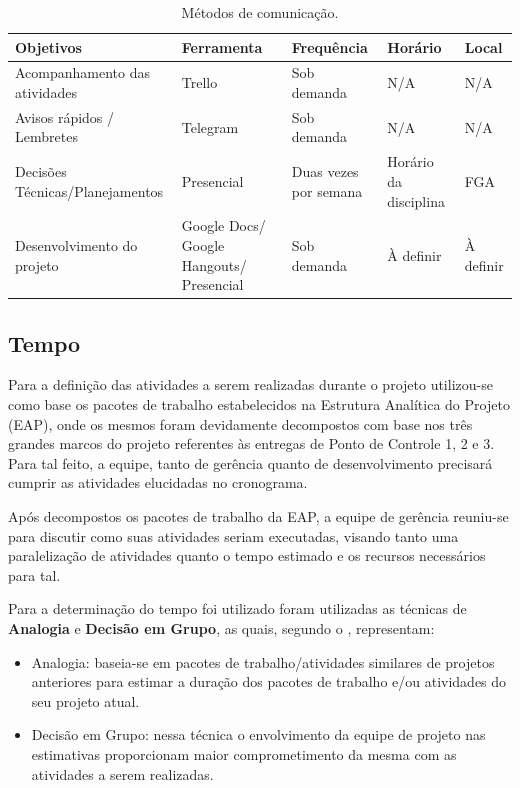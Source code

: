       \begin{table}[!htbp]
      \begin{center}
      \caption{\label{tab:com}Métodos de comunicação.}
      \begin{tabular}{|p{4cm}|p{4cm}|p{3cm}|p{3cm}|p{2cm}|}
      \hline
      \textbf{Objetivos} & \textbf{Ferramenta} & \textbf{Frequência} & \textbf{Horário} & \textbf{Local}\\\hline\hline
      Acompanhamento das atividades & Trello & Sob demanda & N/A & N/A\\\hline
      Avisos rápidos / Lembretes & Telegram & Sob demanda & N/A & N/A\\\hline
      Decisões Técnicas/Planejamentos & Presencial & Duas vezes por semana & Horário da disciplina & FGA\\\hline
      Desenvolvimento do projeto & Google Docs/ Google Hangouts/ Presencial & Sob demanda & À definir & À definir\\\hline
      \end{tabular}
      \end{center}
      \end{table}

    \subsection{Tempo}

      Para a definição das atividades a serem realizadas durante o
      projeto utilizou-se como base os pacotes de trabalho estabelecidos
      na Estrutura Analítica do Projeto (EAP), onde os mesmos foram devidamente
      decompostos com base nos três grandes marcos do projeto referentes
      às entregas de Ponto de Controle 1, 2 e 3. Para tal feito, a equipe,
      tanto de gerência quanto de desenvolvimento precisará cumprir
      as atividades elucidadas no cronograma.
      
      Após decompostos os pacotes de trabalho da EAP, a equipe
      de gerência reuniu-se para discutir como suas atividades seriam
      executadas, visando tanto uma paralelização de atividades quanto
      o tempo estimado e os recursos necessários para tal.
      
      Para a determinação do tempo foi utilizado foram utilizadas as
      técnicas de \textbf{Analogia} e \textbf{Decisão em Grupo},
      as quais, segundo o \cite{PMI2012}, representam:

      \begin{itemize}
        \item Analogia: baseia-se em pacotes de trabalho/atividades similares
        de projetos anteriores para estimar a duração dos pacotes de trabalho
        e/ou atividades do seu projeto atual.
        \item Decisão em Grupo: nessa técnica o envolvimento da equipe de projeto
        nas estimativas proporcionam maior comprometimento da mesma com as
        atividades a serem realizadas.
      \end{itemize}
      
